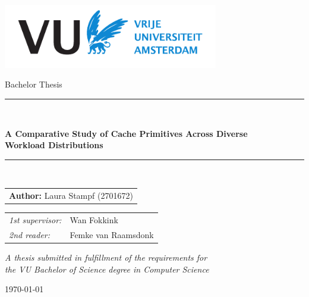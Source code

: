 \documentclass[a4paper, 11pt]{report}
\renewcommand{\chaptername}{} %
\begin{document}
\thispagestyle{empty}

\begin{center}
\vspace{1mm}
\includegraphics[height=28mm]{resources/logo-vua.pdf}
\vspace{1cm}

{\Large Bachelor Thesis}
\vspace{1cm}

\rule{.9\linewidth}{.6pt}\\
\vspace{0.4cm}
{\huge \bfseries A Comparative Study of Cache Primitives Across Diverse \\ Workload Distributions \par}
\vspace{0.4cm}
\rule{.9\linewidth}{.6pt}\\[1.5cm]
\vspace*{2mm}
{\Large

\begin{tabular}{l}
{\bf Author:} Laura Stampf (2701672)
\end{tabular}
}

\vspace*{1.5cm}

\begin{tabular}{ll}
{\it 1st supervisor:} & Wan Fokkink \\
{\it 2nd reader:} & Femke van Raamsdonk  \\
\end{tabular}

\vspace*{2cm}
\textit{A thesis submitted in fulfillment of the requirements for\\ the VU Bachelor
of Science degree in Computer Science }
\vspace*{1cm}

\today %
\end{center}

\pagestyle{fancy}
\fancyhead{} %
\fancyhead[R]{ \leftmark}

\newpage
\tableofcontents




\newpage
\newpage
\newpage
\newpage
\newpage
\newpage

\end{document}
